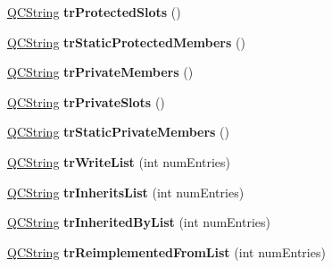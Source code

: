 \begin{DoxyCompactItemize}
\mbox{\hyperlink{class_q_c_string}{Q\+C\+String}} {\bfseries tr\+Protected\+Slots} ()
\item 
\mbox{\label{class_translator_croatian_a656d70c5d40bebcf27253283a29b3a3b}} 
\mbox{\hyperlink{class_q_c_string}{Q\+C\+String}} {\bfseries tr\+Static\+Protected\+Members} ()
\item 
\mbox{\label{class_translator_croatian_a4c720cf92a76e5bc6f363441c2b2b2ef}} 
\mbox{\hyperlink{class_q_c_string}{Q\+C\+String}} {\bfseries tr\+Private\+Members} ()
\item 
\mbox{\label{class_translator_croatian_a4bcf076bc3c637f7b85cb522151698fd}} 
\mbox{\hyperlink{class_q_c_string}{Q\+C\+String}} {\bfseries tr\+Private\+Slots} ()
\item 
\mbox{\label{class_translator_croatian_a4b5985effb669a293df613bc9f94292a}} 
\mbox{\hyperlink{class_q_c_string}{Q\+C\+String}} {\bfseries tr\+Static\+Private\+Members} ()
\item 
\mbox{\label{class_translator_croatian_a0e2f9c53ce33d8e65a36e3203d1ec0f0}} 
\mbox{\hyperlink{class_q_c_string}{Q\+C\+String}} {\bfseries tr\+Write\+List} (int num\+Entries)
\item 
\mbox{\label{class_translator_croatian_abf45478f11b272774c7bdf67e0a81abc}} 
\mbox{\hyperlink{class_q_c_string}{Q\+C\+String}} {\bfseries tr\+Inherits\+List} (int num\+Entries)
\item 
\mbox{\label{class_translator_croatian_a89890ce548f2717097f13385dca7094f}} 
\mbox{\hyperlink{class_q_c_string}{Q\+C\+String}} {\bfseries tr\+Inherited\+By\+List} (int num\+Entries)
\item 
\mbox{\label{class_translator_croatian_a0a7effc3abc7c5d8500518e620724716}} 
\mbox{\hyperlink{class_q_c_string}{Q\+C\+String}} {\bfseries tr\+Reimplemented\+From\+List} (int num\+Entries)
\item 
\mbox{\label{class_translator_croatian_a5ed3b5f07b411c8b570227dc712d05ea}} 

\end{DoxyCompactItemize}
